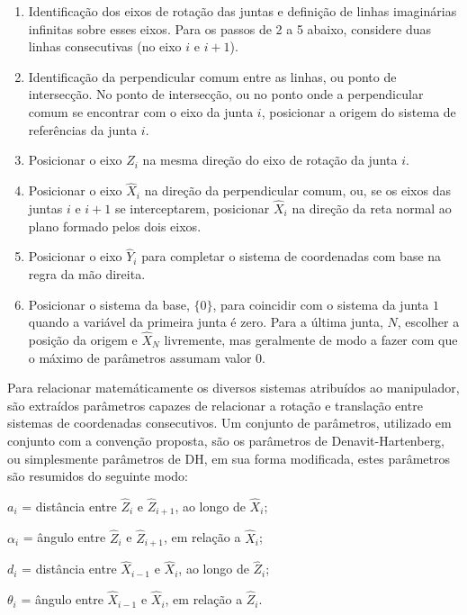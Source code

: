 \begin{enumerate}
    \item   Identificação dos eixos de rotação das juntas e definição de linhas imaginárias
            infinitas sobre esses eixos. Para os passos de 2 a 5 abaixo, considere duas linhas
            consecutivas (no eixo $i$ e $i+1$).
    \item   Identificação da perpendicular comum entre as linhas, ou ponto de intersecção.
            No ponto de intersecção, ou no ponto onde a perpendicular comum se encontrar com 
            o eixo da junta $i$, posicionar a origem do sistema de referências da junta $i$.
    \item   Posicionar o eixo $\hat{Z}_i$ na mesma direção do eixo de rotação da junta $i$.
    \item   Posicionar o eixo $\hat{X}_i$ na direção da perpendicular comum, ou, se os eixos 
            das juntas $i$ e $i+1$ se interceptarem, posicionar $\hat{X}_i$ na direção da reta normal
            ao plano formado pelos dois eixos.
    \item   Posicionar o eixo $\hat{Y}_i$ para completar o sistema de coordenadas com base na regra da mão direita.
    \item   Posicionar o sistema da base, $\{0\}$, para coincidir com o sistema da junta ${1}$ quando 
            a variável da primeira junta é zero. Para a última junta, ${N}$, escolher a posição da origem e $\hat{X}_N$
            livremente, mas geralmente de modo a fazer com que o máximo de parâmetros assumam valor 0. 
\end{enumerate}

Para relacionar matemáticamente os diversos sistemas atribuídos ao 
manipulador, são extraídos parâmetros capazes de relacionar a rotação
e translação entre sistemas de coordenadas consecutivos. Um 
conjunto de parâmetros, utilizado em conjunto com a convenção proposta,
são os parâmetros de Denavit-Hartenberg, ou simplesmente parâmetros de 
DH, em sua forma modificada, estes parâmetros são resumidos do seguinte
modo:

\begin{itemize}
    \begin{centering}
    \item[] $a_i$ = distância entre $\hat{Z}_i$ e $\hat{Z}_{i+1}$, ao longo de $\hat{X}_i$;
    \item[] $\alpha_i$ = ângulo entre $\hat{Z}_i$ e $\hat{Z}_{i+1}$, em relação a $\hat{X}_i$;
    \item[] $d_i$ = distância entre $\hat{X}_{i-1}$ e $\hat{X}_i$, ao longo de $\hat{Z}_i$;
    \item[] $\theta_i$ = ângulo entre $\hat{X}_{i-1}$ e $\hat{X}_i$, em relação a $\hat{Z}_i$.
    \par\end{centering}
\end{itemize}

